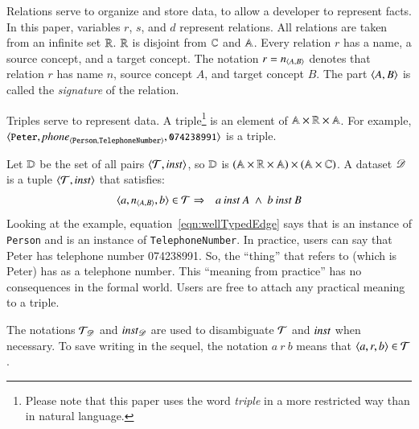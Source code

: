\documentclass{elsarticle}
\begin{document}
   Relations serve to organize and store data, to allow a developer to represent facts.
   In this paper, variables $r$, $s$, and $d$ represent relations.
   All relations are taken from an infinite set $\mathbb{R}$.
   $\mathbb{R}$ is disjoint from $\mathbb{C}$ and $\mathbb{A}$.
   Every relation $r$ has a name, a source concept, and a target concept.
   The notation $r=\text{\it n\/}_{\langle{A},{B}\rangle}$ denotes that relation $r$ has name $n$, source concept $A$, and target concept $B$.
   The part $\langle{A},{B}\rangle$ is called the {\em signature} of the relation.


   Triples serve to represent data.
   A triple\footnote{Please note that this paper uses the word {\em triple} in a more restricted way than in natural language.}
   is an element of $\mathbb{A}\times\mathbb{R}\times\mathbb{A}$.
   For example, $\langle{\text{{\tt\small Peter}}},{\text{\it \text{\it phone\/}\/}_{\langle{\tt Person},{\tt TelephoneNumber}\rangle}},{\text{{\tt\small 074238991}}}\rangle$ is a triple.

   Let $\mathbb{D}$ be the set of all pairs $\langle{\mathcal{T}},{\mathbin{\text{\it inst\/}}}\rangle$, so
   $\mathbb{D}$ is $(\mathbb{A}\times\mathbb{R}\times\mathbb{A})\times(\mathbb{A}\times\mathbb{C})$.
   A dataset $\mathscr{D}$ is a tuple $\langle{\mathcal{T}},{\mathbin{\text{\it inst\/}}}\rangle$ that satisfies:
\begin{eqnarray}
   \langle{a},{\text{\it n\/}_{\langle{A},{B}\rangle}},{b}\rangle\in\mathcal{T}&\Rightarrow&a\mathbin{\text{\it inst\/}} A\ \wedge\ b\mathbin{\text{\it inst\/}} B
   \label{eqn:wellTypedEdge}
\end{eqnarray}
   Looking at the example,
   equation~\ref{eqn:wellTypedEdge} says that  is an instance of {\tt Person} and  is an instance of {\tt TelephoneNumber}.
   In practice, users can say that Peter has telephone number 074238991.
   So, the ``thing'' that  refers to (which is Peter) has  as a telephone number.
   This ``meaning from practice'' has no consequences in the formal world.
   Users are free to attach any practical meaning to a triple.

   The notations $\mathcal{T}_{\mathscr{D}}$ and $\mathbin{\text{\it inst\/}}_{\mathscr{D}}$ are used to disambiguate $\mathcal{T}$ and $\mathbin{\text{\it inst\/}}$ when necessary.
   To save writing in the sequel, the notation $a\ r\ b$ means that $\langle{a},{r},{b}\rangle\in\mathcal{T}$.
\end{document}
